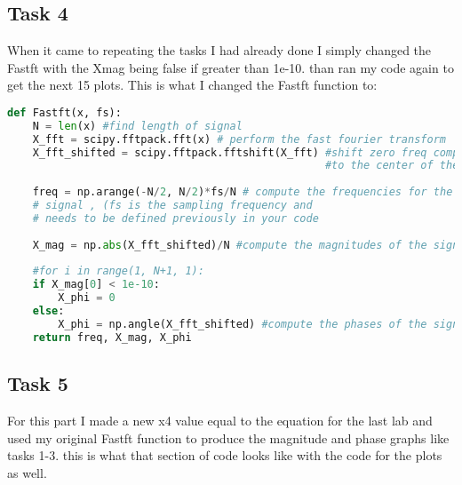 \documentclass[12pt]{report}
\begin{document}
\subsection{Task 4}
When it came to repeating the tasks I had already done I simply changed the Fastft with the Xmag being false if greater than 1e-10. than ran my code again to get the next 15 plots. This is what I changed the Fastft function to:

\begin{lstlisting}[language=Python]
def Fastft(x, fs):
    N = len(x) #find length of signal
    X_fft = scipy.fftpack.fft(x) # perform the fast fourier transform
    X_fft_shifted = scipy.fftpack.fftshift(X_fft) #shift zero freq components
                                                  #to the center of the spectrum
    
    freq = np.arange(-N/2, N/2)*fs/N # compute the frequencies for the output
    # signal , (fs is the sampling frequency and
    # needs to be defined previously in your code
    
    X_mag = np.abs(X_fft_shifted)/N #compute the magnitudes of the signal
    
    #for i in range(1, N+1, 1):
    if X_mag[0] < 1e-10:
        X_phi = 0
    else:
        X_phi = np.angle(X_fft_shifted) #compute the phases of the signal 
    return freq, X_mag, X_phi

\end{lstlisting}

\subsection{Task 5}
For this part I made a new x4 value equal to the equation for the last lab and used my original Fastft function to produce the magnitude and phase graphs like tasks 1-3. this is what that section of code looks like with the code for the plots as well. 
\end{document}
